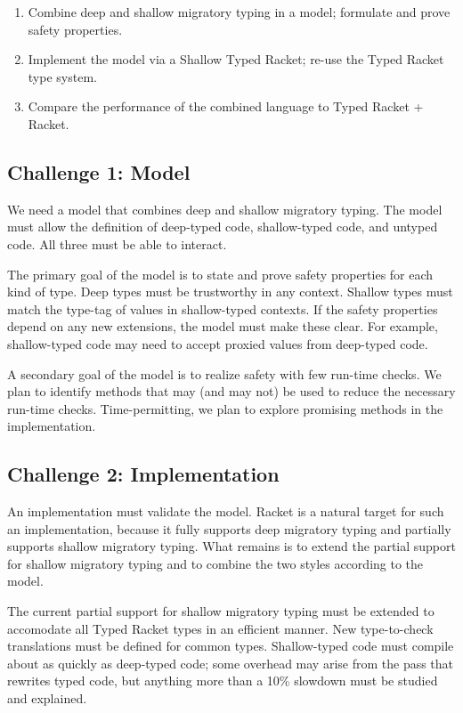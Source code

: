 \begin{enumerate}
\item Combine deep and shallow migratory typing in a model; formulate and prove safety properties.
\item Implement the model via a Shallow Typed Racket; re-use the Typed Racket type system.
\item Compare the performance of the combined language to Typed Racket + Racket.
\end{enumerate}

\subsection{Challenge 1: Model}

We need a model that combines deep and shallow migratory typing.
The model must allow the definition of deep-typed code, shallow-typed code, and untyped code.
All three must be able to interact.

The primary goal of the model is to state and prove safety properties for each kind of type.
Deep types must be trustworthy in any context.
Shallow types must match the type-tag of values in shallow-typed contexts.
If the safety properties depend on any new extensions, the model must make these clear.
For example, shallow-typed code may need to accept proxied values from deep-typed code.


A secondary goal of the model is to realize safety with few run-time checks.
We plan to identify methods that may (and may not) be used to reduce the necessary run-time checks.
Time-permitting, we plan to explore promising methods in the implementation.


\subsection{Challenge 2: Implementation}

An implementation must validate the model.
Racket is a natural target for such an implementation, because it fully supports deep migratory typing and partially supports shallow migratory typing.
What remains is to extend the partial support for shallow migratory typing and to combine the two styles according to the model.

The current partial support for shallow migratory typing must be extended to accomodate all Typed Racket types in an efficient manner.
New type-to-check translations must be defined for common types.
Shallow-typed code must compile about as quickly as deep-typed code; some overhead may arise from the pass that rewrites typed code, but anything more than a 10\% slowdown must be studied and explained.

